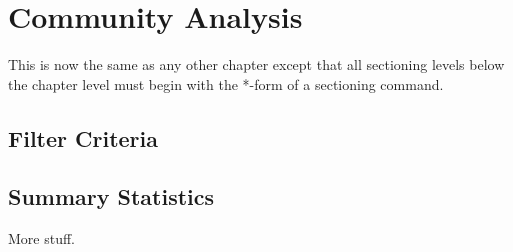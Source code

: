 \chapter{Community Analysis}

This is now the same as any other chapter except that
all sectioning levels below the chapter level must begin
with the *-form of a sectioning command.

\section*{Filter Criteria}
\section*{Summary Statistics}

More stuff.
